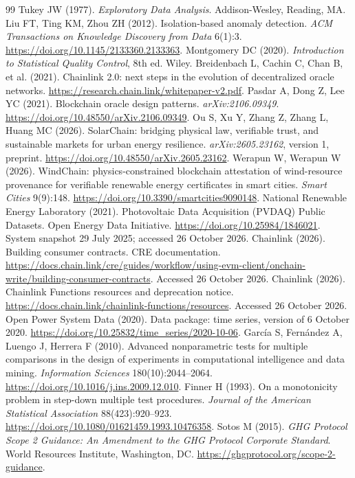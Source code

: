 \documentclass[11pt,a4paper]{article}
\begin{document}
\begin{thebibliography}{99}
 Tukey JW (1977). \emph{Exploratory Data Analysis}. Addison-Wesley, Reading, MA.
 Liu FT, Ting KM, Zhou ZH (2012). Isolation-based anomaly detection. \emph{ACM Transactions on Knowledge Discovery from Data} 6(1):3. \url{https://doi.org/10.1145/2133360.2133363}.
 Montgomery DC (2020). \emph{Introduction to Statistical Quality Control}, 8th ed. Wiley.
 Breidenbach L, Cachin C, Chan B, et al. (2021). Chainlink 2.0: next steps in the evolution of decentralized oracle networks. \url{https://research.chain.link/whitepaper-v2.pdf}.
 Pasdar A, Dong Z, Lee YC (2021). Blockchain oracle design patterns. \emph{arXiv:2106.09349}. \url{https://doi.org/10.48550/arXiv.2106.09349}.
 Ou S, Xu Y, Zhang Z, Zhang L, Huang MC (2026). SolarChain: bridging physical law, verifiable trust, and sustainable markets for urban energy resilience. \emph{arXiv:2605.23162}, version 1, preprint. \url{https://doi.org/10.48550/arXiv.2605.23162}.
 Werapun W, Werapun W (2026). WindChain: physics-constrained blockchain attestation of wind-resource provenance for verifiable renewable energy certificates in smart cities. \emph{Smart Cities} 9(9):148. \url{https://doi.org/10.3390/smartcities9090148}.
 National Renewable Energy Laboratory (2021). Photovoltaic Data Acquisition (PVDAQ) Public Datasets. Open Energy Data Initiative. \url{https://doi.org/10.25984/1846021}. System snapshot 29 July 2025; accessed 26 October 2026.
 Chainlink (2026). Building consumer contracts. CRE documentation. \url{https://docs.chain.link/cre/guides/workflow/using-evm-client/onchain-write/building-consumer-contracts}. Accessed 26 October 2026.
 Chainlink (2026). Chainlink Functions resources and deprecation notice. \url{https://docs.chain.link/chainlink-functions/resources}. Accessed 26 October 2026.
 Open Power System Data (2020). Data package: time series, version of 6 October 2020. \url{https://doi.org/10.25832/time_series/2020-10-06}.
 Garc\'ia S, Fern\'andez A, Luengo J, Herrera F (2010). Advanced nonparametric tests for multiple comparisons in the design of experiments in computational intelligence and data mining. \emph{Information Sciences} 180(10):2044--2064. \url{https://doi.org/10.1016/j.ins.2009.12.010}.
 Finner H (1993). On a monotonicity problem in step-down multiple test procedures. \emph{Journal of the American Statistical Association} 88(423):920--923. \url{https://doi.org/10.1080/01621459.1993.10476358}.
 Sotos M (2015). \emph{GHG Protocol Scope 2 Guidance: An Amendment to the GHG Protocol Corporate Standard}. World Resources Institute, Washington, DC. \url{https://ghgprotocol.org/scope-2-guidance}.
\end{thebibliography}
\end{document}
